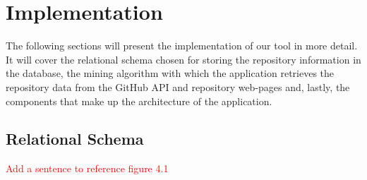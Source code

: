 \chapter{Implementation}\label{ch:4}

The following sections will present the implementation of our tool in more detail.
It will cover the relational schema chosen for storing the repository information in the database, the mining algorithm with which the application retrieves the repository data from the GitHub API and repository web-pages and, lastly, the components that make up the architecture of the application.

\section{Relational Schema}

\textcolor{red}{Add a sentence to reference figure 4.1}


